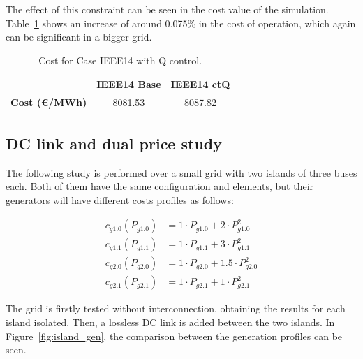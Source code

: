 The effect of this constraint can be seen in the cost value of the simulation. Table~\ref{tab:ctQ_cost} shows an increase of around 0.075\% in the cost of operation, which again can be significant in a bigger grid.

\begin{table}[H]
    \centering
    \caption{Cost for Case IEEE14 with Q control.}
    \begin{tabular}{lcc}
    \hline
     & {\textbf{IEEE14 Base}}& {\textbf{IEEE14 ctQ}}\\ \hline\hline
    \textbf{Cost (€/MWh)} & 8081.53 & 8087.82 \\ \hline
    \end{tabular}
    \label{tab:ctQ_cost}
\end{table}

\subsection{DC link and dual price study}

The following study is performed over a small grid with two islands of three buses each. Both of them have the same configuration and elements, but their generators will have different costs profiles as follows:

\begin{equation}
    \begin{split}
        c_{g1.0}(P_{g1.0}) &= 1 \cdot P_{g1.0} + 2 \cdot P_{g1.0}^2 \\
        c_{g1.1}(P_{g1.1}) &= 1 \cdot P_{g1.1} + 3 \cdot P_{g1.1}^2 \\
        c_{g2.0}(P_{g2.0}) &= 1 \cdot P_{g2.0} + 1.5 \cdot P_{g2.0}^2 \\
        c_{g2.1}(P_{g2.1}) &= 1 \cdot P_{g2.1} + 1 \cdot P_{g2.1}^2
    \end{split}
\end{equation}

The grid is firstly tested without interconnection, obtaining the results for each island isolated. Then, a lossless DC link is added between the two islands. In Figure~\ref{fig:island_gen}, 
the comparison between the generation profiles can be seen.

